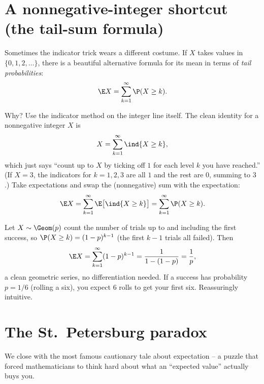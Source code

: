 \section{A nonnegative-integer shortcut (the tail-sum formula)}
\label{ch08:tail-sum}

Sometimes the indicator trick wears a different costume. If $X$ takes values in
$\{0, 1, 2, \dots\}$, there is a beautiful alternative formula for its mean in
terms of \emph{tail probabilities}:
\[
  \E X = \sum_{k=1}^{\infty} \P(X \ge k).
\]

\begin{whybox}
Why? Use the indicator method on the integer line itself. The clean identity for
a nonnegative integer $X$ is
\[
  X = \sum_{k=1}^{\infty} \ind\{X \ge k\},
\]
which just says ``count up to $X$ by ticking off $1$ for each level $k$ you have
reached.'' (If $X = 3$, the indicators for $k=1,2,3$ are all $1$ and the rest are
$0$, summing to $3$.) Take expectations and swap the (nonnegative) sum with the
expectation:
\[
  \E X = \sum_{k=1}^\infty \E\bigl[\ind\{X\ge k\}\bigr] = \sum_{k=1}^\infty \P(X \ge k).
\]
\end{whybox}

\begin{example}
\label{ch08:ex-geom}
Let $X \sim \Geom(p)$ count the number of trials up to and including the first
success, so $\P(X \ge k) = (1-p)^{k-1}$ (the first $k-1$ trials all failed). Then
\[
  \E X = \sum_{k=1}^\infty (1-p)^{k-1} = \frac{1}{1-(1-p)} = \frac1p,
\]
a clean geometric series, no differentiation needed. If a success has probability
$p = 1/6$ (rolling a six), you expect $6$ rolls to get your first six. Reassuringly
intuitive.
\end{example}

\section{The St.\ Petersburg paradox}
\label{ch08:st-petersburg}

We close with the most famous cautionary tale about expectation -- a puzzle that
forced mathematicians to think hard about what an ``expected value'' actually
buys you.

